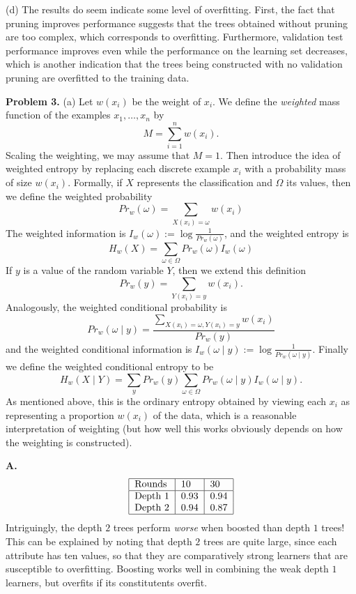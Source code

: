 \documentclass[12pt]{amsart}
\theoremstyle{remark}
\begin{document}
(d) The results do seem indicate some level of overfitting. First, the fact that pruning improves performance suggests that the trees obtained without pruning are too complex, which corresponds to overfitting. Furthermore, validation test performance improves even while the performance on the learning set decreases, which is another indication that the trees being constructed with no validation pruning are overfitted to the training data. 
\newpage

\noindent \textbf{Problem 3.} (a)  Let $w(x_i)$ be the weight of $x_i$. We define the \emph{weighted} mass function of the examples $x_1, \ldots, x_n$ by 
\[
M = \sum_{i=1}^n w(x_i). 
\]
Scaling the weighting, we may assume that $M=1$. Then introduce the idea of weighted entropy by replacing each discrete example $x_i$ with a probability mass of size $w(x_i)$. Formally, if $X$ represents the classification and $\Omega$ its values, then we define the weighted probability 
\[
Pr_w(\omega) = \sum_{X(x_i) = \omega} w(x_i) 
\]
The weighted information is $I_w(\omega)  := \log \frac{1}{Pr_w(\omega)}$, and the weighted entropy is 
\[
H_w(X) = \sum_{\omega \in \Omega} Pr_w(\omega) I_w(\omega)
\]
If $y$ is a value of the random variable $Y$, then we extend this definition 
\[
Pr_w(y) = \sum_{Y(x_i) = y} w(x_i).
\]
Analogously, the weighted conditional probability is 
\[
Pr_w(\omega \mid y) =\frac{ \sum_{X(x_i) = \omega, Y(x_i) = y} w(x_i)}{Pr_w(y)}
\]
and the weighted conditional information is $I_w(\omega \mid y ) := \log \frac{1}{Pr_w(\omega \mid y)}$. 
Finally we define the weighted conditional entropy to be  
\[
H_w(X \mid Y) = \sum_y Pr_w(y) \sum_{\omega \in \Omega} Pr_w(\omega \mid y) I_w(\omega \mid y).
\]
As mentioned above, this is the ordinary entropy obtained by viewing each $x_i$ as representing a proportion $w(x_i)$ of the data, which is a reasonable interpretation of weighting (but how well this works obviously depends on how the weighting is constructed). 

\textbf{A.} 
\[
\begin{tabular}{|l|l|l|l|}
\hline
 Rounds & 10 & 30 \\
\hline
Depth 1& 0.93 &  0.94 \\
Depth 2 & 0.94 &  0.87\\
\hline
\end{tabular}
\]
Intriguingly, the depth $2$ trees perform \emph{worse} when boosted than depth $1$ trees! This can be explained by noting that depth $2$ trees are quite large, since each attribute has ten values, so that they are comparatively strong learners that are susceptible to overfitting. Boosting works well in combining the weak depth $1$ learners, but overfits if its constitutents overfit. \\
\end{document}
